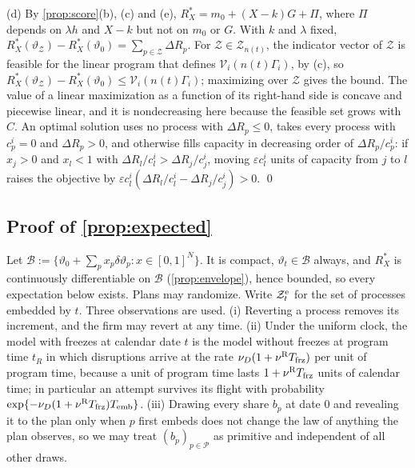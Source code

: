 (d) By \autoref{prop:score}(b), (c) and (e), $R^*_X=m_0+(X-k)G+\Pi$, where $\Pi$ depends on $\lambda h$ and $X-k$ but not on $m_0$ or $G$. With $k$ and $\lambda$ fixed, $R^*_X(\vartheta_{\mathcal Z})-R^*_X(\vartheta_0)=\sum_{p\in\mathcal Z}\Delta R_p$. For $\mathcal Z\in\mathcal Z_{n(t)}$, the indicator vector of $\mathcal Z$ is feasible for the linear program that defines $\mathcal V_i(n(t)\Gamma_i)$, by (c), so $R^*_X(\vartheta_{\mathcal Z})-R^*_X(\vartheta_0)\le\mathcal V_i(n(t)\Gamma_i)$; maximizing over $\mathcal Z$ gives the bound. The value of a linear maximization as a function of its right-hand side is concave and piecewise linear, and it is nondecreasing here because the feasible set grows with $C$. An optimal solution uses no process with $\Delta R_p\le0$, takes every process with $c^i_p=0$ and $\Delta R_p>0$, and otherwise fills capacity in decreasing order of $\Delta R_p/c^i_p$: if $x_j>0$ and $x_l<1$ with $\Delta R_l/c^i_l>\Delta R_j/c^i_j$, moving $\varepsilon c^i_l$ units of capacity from $j$ to $l$ raises the objective by $\varepsilon c^i_l(\Delta R_l/c^i_l-\Delta R_j/c^i_j)>0$. \qed

\subsection*{Proof of \autoref{prop:expected}}

Let $\mathcal B:=\{\vartheta_0+\sum_px_p\delta\vartheta_p:x\in[0,1]^N\}$. It is compact, $\vartheta_t\in\mathcal B$ always, and $R^*_X$ is continuously differentiable on $\mathcal B$ (\autoref{prop:envelope}), hence bounded, so every expectation below exists. Plans may randomize. Write $\mathcal Z^{\rm e}_t$ for the set of processes embedded by $t$. Three observations are used. (i) Reverting a process removes its increment, and the firm may revert at any time. (ii) Under the uniform clock, the model with freezes at calendar date $t$ is the model without freezes at program time $t_R$ in which disruptions arrive at the rate $\nu_D(1+\nu^{\rm R}T_{\rm frz})$ per unit of program time, because a unit of program time lasts $1+\nu^{\rm R}T_{\rm frz}$ units of calendar time; in particular an attempt survives its flight with probability $\exp\{-\nu_D(1+\nu^{\rm R}T_{\rm frz})T_{\mathrm{emb}}\}$. (iii) Drawing every share $b_p$ at date 0 and revealing it to the plan only when $p$ first embeds does not change the law of anything the plan observes, so we may treat $(b_p)_{p\in\mathcal P}$ as primitive and independent of all other draws.

